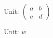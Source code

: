 \documentclass{ctexart}
\begin{document}
Unit: $ \begin{pmatrix}a&b\\c&d\end{pmatrix}$

Unit: $ w$
\end{document}
